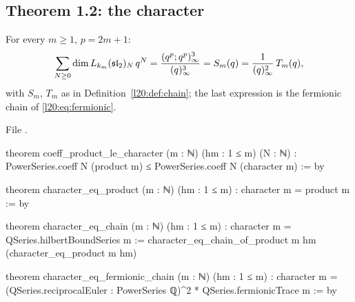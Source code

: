 \subsection{Theorem 1.2: the character}

\begin{theorem}\label{l20:thm:character}
For every $m\ge1$, $p=2m+1$:
\begin{equation*}
\sum_{N\ge0}\dim L_{k_m}(\mathfrak{sl}_2)_N\,q^N=\frac{(q^p;q^p)_\infty^3}{(q)_\infty^3}=S_m(q)
=\frac{1}{(q)_\infty^2}\,T_m(q),
\end{equation*}
with $S_m$, $T_m$ as in Definition~\ref{l20:def:chain}; the last expression is the fermionic chain of
\eqref{l20:eq:fermionic}.
\end{theorem}
\noindent File .
\begin{leancode}
theorem coeff_product_le_character (m : ℕ) (hm : 1 ≤ m) (N : ℕ) :
    PowerSeries.coeff N (product m) ≤ PowerSeries.coeff N (character m) := by

theorem character_eq_product (m : ℕ) (hm : 1 ≤ m) :
    character m = product m := by

theorem character_eq_chain (m : ℕ) (hm : 1 ≤ m) :
    character m = QSeries.hilbertBoundSeries m :=
  character_eq_chain_of_product m hm (character_eq_product m hm)

theorem character_eq_fermionic_chain (m : ℕ) (hm : 1 ≤ m) :
    character m = (QSeries.reciprocalEuler : PowerSeries ℚ)^2 * QSeries.fermionicTrace m := by
\end{leancode}


